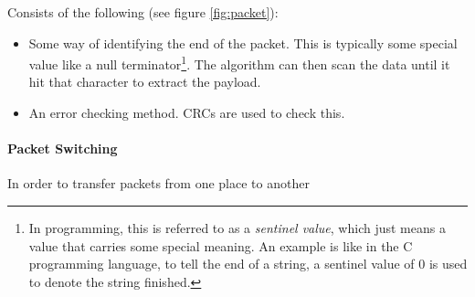 \documentclass[../main.tex]{subfiles}
\begin{document}
Consists of the following (see figure \ref{fig:packet}):

\begin{itemize}
    \item Some way of identifying the end of the packet. This is typically some special value like a null terminator\footnote{In programming,
          this is referred to as a \emph{sentinel value}, which just means a value that carries some special meaning. An example is like in the
          C programming language, to tell the end of a string, a sentinel value of 0 is used to denote the string finished.}. The algorithm can
          then scan the data until it hit that character to extract the payload.
    \item An error checking method. CRCs are used to check this.
\end{itemize}

\paragraph{Packet Switching}

In order to transfer packets from one place to another
\end{document}
